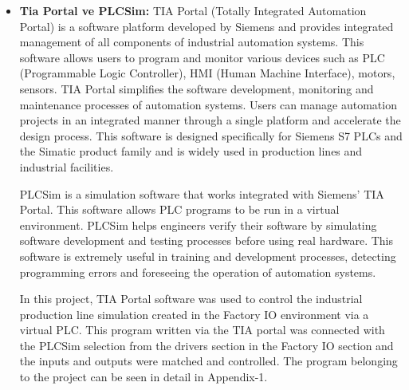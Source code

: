 \begin{itemize}
    \item \textbf{Tia Portal ve PLCSim:} TIA Portal (Totally Integrated Automation Portal) is a software platform developed by Siemens and provides integrated management of all components of industrial automation systems. This software allows users to program and monitor various devices such as PLC (Programmable Logic Controller), HMI (Human Machine Interface), motors, sensors. TIA Portal simplifies the software development, monitoring and maintenance processes of automation systems. Users can manage automation projects in an integrated manner through a single platform and accelerate the design process. This software is designed specifically for Siemens S7 PLCs and the Simatic product family and is widely used in production lines and industrial facilities.

    PLCSim is a simulation software that works integrated with Siemens' TIA Portal. This software allows PLC programs to be run in a virtual environment. PLCSim helps engineers verify their software by simulating software development and testing processes before using real hardware. This software is extremely useful in training and development processes, detecting programming errors and foreseeing the operation of automation systems.

    In this project, TIA Portal software was used to control the industrial production line simulation created in the Factory IO environment via a virtual PLC. This program written via the TIA portal was connected with the PLCSim selection from the drivers section in the Factory IO section and the inputs and outputs were matched and controlled. The program belonging to the project can be seen in detail in Appendix-1.
\end{itemize}

